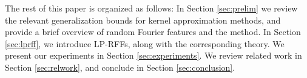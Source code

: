 The rest of this paper is organized as follows: In Section \ref{sec:prelim} we review the relevant generalization bounds for kernel approximation methods, and provide a brief overview of random Fourier features and the \Nystrom method.  In Section \ref{sec:lprff}, we introduce LP-RFFs, along with the corresponding theory. We present our experiments in Section \ref{sec:experiments}.  We review related work in Section \ref{sec:relwork}, and conclude in Section \ref{sec:conclusion}.







